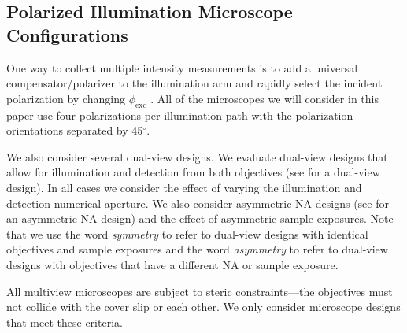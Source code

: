 \documentclass[10pt]{article}
\begin{document}
\subsection{Polarized Illumination Microscope Configurations}\label{designs}
One way to collect multiple intensity measurements is to add a universal
compensator/polarizer to the illumination arm and rapidly select the incident
polarization by changing $\phi_{\text{exc}}$ \cite{shribak2003}. All of the
microscopes we will consider in this paper use four polarizations per
illumination path with the polarization orientations separated by
45${}^{\circ}$.

We also consider several dual-view designs. We evaluate dual-view designs that
allow for illumination and detection from both objectives (see \cite{wu2013} for
a dual-view design). In all cases we consider the effect of varying the
illumination and detection numerical aperture. We also consider asymmetric NA
designs (see \cite{wu2017} for an asymmetric NA design) and the effect of
asymmetric sample exposures. Note that we use the word \emph{symmetry} to refer
to dual-view designs with identical objectives and sample exposures and the word
\emph{asymmetry} to refer to dual-view designs with objectives that have a
different NA or sample exposure.

All multiview microscopes are subject to steric constraints---the objectives
must not collide with the cover slip or each other. We only consider microscope
designs that meet these criteria.
\end{document}

